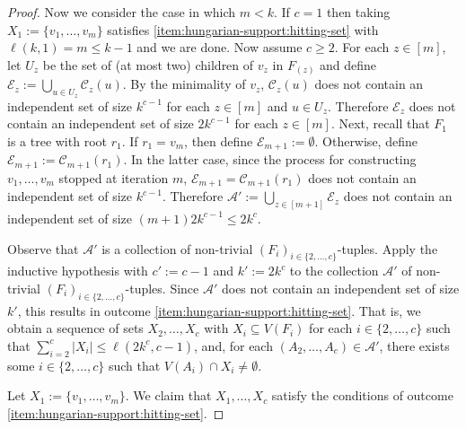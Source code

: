 \documentclass{patmorin}
\begin{document}
\begin{proof}
  Now we consider the case in which $m<k$.  If $c=1$ then taking $X_1:=\{v_1,\ldots,v_m\}$ satisfies \cref{item:hungarian-support:hitting-set} with $\ell(k,1)=m\le k-1$ and we are done. Now assume $c\ge 2$.
  For each $z\in[m]$, let $U_{z}$ be the set of (at most two) children of $v_z$ in $F_{(z)}$ and define $\mathcal{E}_{z}:=\bigcup_{u\in U_z}\mathcal{C}_{z}(u)$.  By the minimality of $v_z$, $\mathcal{C}_{z}(u)$ does not contain an independent set of size $k^{c-1}$ for each $z\in[m]$ and $u\in U_{z}$. Therefore $\mathcal{E}_{z}$ does not contain an independent set of size $2k^{c-1}$ for each $z\in[m]$.  Next, recall that $F_1$ is a tree with root $r_1$.  If $r_1 = v_m$, then define $\mathcal{E}_{m+1}:=\emptyset$. Otherwise, define $\mathcal{E}_{m+1}:=\mathcal{C}_{m+1}(r_1)$.  In the latter case, since the process for constructing $v_1,\ldots,v_m$ stopped at iteration $m$, $\mathcal{E}_{m+1}=\mathcal{C}_{m+1}(r_1)$ does not contain an independent set of size $k^{c-1}$. Therefore $\mathcal{A'}:=\bigcup_{z\in[m+1]}\mathcal{E}_z$ does not contain an independent set of size $(m+1)2k^{c-1} \le 2k^{c}$.

  Observe that $\mathcal{A}'$ is a collection of non-trivial $(F_i)_{i\in\{2,\ldots,c\}}$-tuples.  Apply the inductive hypothesis with $c':=c-1$ and $k':=2k^{c}$ to the collection $\mathcal{A}'$ of non-trivial $(F_i)_{i\in\{2,\ldots,c\}}$-tuples.  Since $\mathcal{A}'$ does not contain an independent set of size $k'$, this results in outcome \cref{item:hungarian-support:hitting-set}.  That is, we obtain a sequence of sets $X_2,\ldots,X_c$ with $X_i\subseteq V(F_i)$ for each $i\in\{2,\ldots,c\}$ such that $\sum_{i=2}^c|X_i|\le\ell(2k^{c},c-1)$,  and, for each $(A_2,\ldots,A_c)\in\mathcal{A}'$, there exists some $i\in\{2,\ldots,c\}$ such that $V(A_i)\cap X_i\neq\emptyset$.

  Let $X_1:=\{v_1,\ldots,v_m\}$.  We claim that $X_1,\ldots,X_c$ satisfy the conditions of outcome \cref{item:hungarian-support:hitting-set}.


\end{proof}
\end{document}
